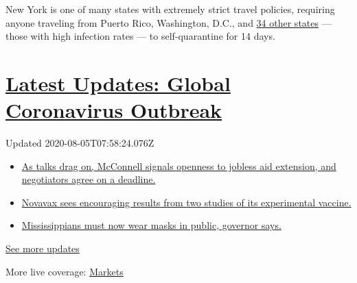 New York is one of many states with extremely strict travel policies,
requiring anyone traveling from Puerto Rico, Washington, D.C., and
\href{https://coronavirus.health.ny.gov/covid-19-travel-advisory}{34
other states} --- those with high infection rates --- to self-quarantine
for 14 days.

\hypertarget{latest-updates-global-coronavirus-outbreak}{%
\section{\texorpdfstring{\href{https://www.nytimes3xbfgragh.onion/2020/08/04/world/coronavirus-cases.html?action=click\&pgtype=Article\&state=default\&region=MAIN_CONTENT_1\&context=storylines_live_updates}{Latest
Updates: Global Coronavirus
Outbreak}}{Latest Updates: Global Coronavirus Outbreak}}\label{latest-updates-global-coronavirus-outbreak}}

Updated 2020-08-05T07:58:24.076Z

\begin{itemize}
\tightlist
\item
  \href{https://www.nytimes3xbfgragh.onion/2020/08/04/world/coronavirus-cases.html?action=click\&pgtype=Article\&state=default\&region=MAIN_CONTENT_1\&context=storylines_live_updates\#link-762df92}{As
  talks drag on, McConnell signals openness to jobless aid extension,
  and negotiators agree on a deadline.}
\item
  \href{https://www.nytimes3xbfgragh.onion/2020/08/04/world/coronavirus-cases.html?action=click\&pgtype=Article\&state=default\&region=MAIN_CONTENT_1\&context=storylines_live_updates\#link-1228a480}{Novavax
  sees encouraging results from two studies of its experimental
  vaccine.}
\item
  \href{https://www.nytimes3xbfgragh.onion/2020/08/04/world/coronavirus-cases.html?action=click\&pgtype=Article\&state=default\&region=MAIN_CONTENT_1\&context=storylines_live_updates\#link-794484ed}{Mississippians
  must now wear masks in public, governor says.}
\end{itemize}

\href{https://www.nytimes3xbfgragh.onion/2020/08/04/world/coronavirus-cases.html?action=click\&pgtype=Article\&state=default\&region=MAIN_CONTENT_1\&context=storylines_live_updates}{See
more updates}

More live coverage:
\href{https://www.nytimes3xbfgragh.onion/live/2020/08/04/business/stock-market-today-coronavirus?action=click\&pgtype=Article\&state=default\&region=MAIN_CONTENT_1\&context=storylines_live_updates}{Markets}

